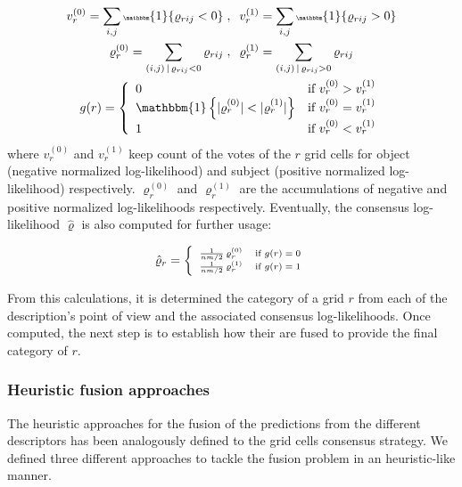 \documentclass[10pt,twocolumn,letterpaper]{article}
\begin{document}
\begin{gather*}\tiny
v_r^{(0)} = \sum_{i,j} \mathbbm{1}\{\varrho_{rij} < 0\} \;,\;\; v_r^{(1)} = \sum_{i,j} \mathbbm{1}\{\varrho_{rij} > 0\}  \\
\varrho_{r}^{(0)} = \sum_{(i,j) \,|\, \varrho_{rij} < 0} \varrho_{rij} \;,\;\; \varrho_{r}^{(1)} = \sum_{(i,j) \,|\, \varrho_{rij} > 0} \varrho_{rij} \\
g(r) =
\left\{
	\begin{array}{ll}
		0  & \mbox{if }  v_r^{(0)} > v_r^{(1)} \\
		\mathbbm{1}\left\{ |\varrho_{r}^{(0)}| < |\varrho_{r}^{(1)}| \right\} &  \mbox{if } v_r^{(0)} = v_r^{(1)} \\
		1 & \mbox{if }  v_r^{(0)} < v_r^{(1)} \\
	\end{array}
\right.
\end{gather*}
where $v_r^{(0)}$ and $v_r^{(1)}$ keep count of the votes of the $r$ grid cells for object (negative normalized log-likelihood) and subject (positive normalized log-likelihood) respectively. $\varrho_r^{(0)}$ and $\varrho_r^{(1)}$ are the accumulations of negative and positive normalized log-likelihoods respectively. Eventually, the consensus log-likelihood $\hat{\varrho}$ is also computed for further usage:

\begin{gather*}\scriptsize
\hat{\varrho}_r =
\left\{
	\begin{array}{ll}
		\frac{1}{nm / 2} \, \varrho_{r}^{(0)}  & \mbox{if }  g(r) = 0  \\
		\frac{1}{nm / 2} \, \varrho_{r}^{(1)} & \mbox{if }  g(r) = 1
	\end{array}
\right.
\end{gather*}

From this calculations, it is determined the category of a grid $r$ from each of the description's point of view and the associated consensus log-likelihoods. Once computed, the next step is to establish how their are fused to provide the final category of $r$.

\subsubsection{Heuristic fusion approaches}

The heuristic approaches for the fusion of the predictions from the different descriptors has been analogously defined to the grid cells consensus strategy. We defined three different approaches to tackle the fusion problem in an heuristic-like manner.
\end{document}
